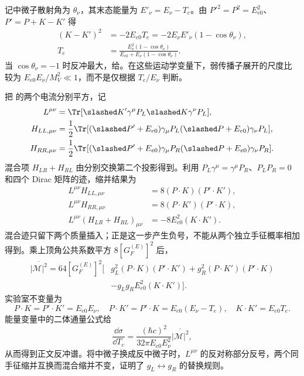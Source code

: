 \begin{derivation}[反冲运动学与手征自旋求和]
记中微子散射角为 $\theta_\nu$，其末态能量为 $E'_\nu=E_\nu-T_e$。由 $P'^2=P^2=E_{e0}^2$、$P'=P+K-K'$ 得
\begin{align*}
 (K-K')^2&=-2E_{e0}T_e
 =-2E_\nu E'_\nu(1-\cos\theta_\nu),\\
 T_e&=\frac{E_\nu^2(1-\cos\theta_\nu)}
 {E_{e0}+E_\nu(1-\cos\theta_\nu)}.
\end{align*}
当 $\cos\theta_\nu=-1$ 时反冲最大，给。在这些运动学变量下，弱传播子展开的尺度比较为 $E_{e0}E_\nu/M_V^2\ll1$，而不是仅根据 $T_e/E_\nu$ 判断。

把 的两个电流分别平方，记
\begin{align*}
 L^{\mu\nu}&=\Tr[\slashed K'\gamma^\mu P_L\slashed K\gamma^\nu P_L],\\
 H_{LL,\mu\nu}&=\frac12\Tr[(\slashed P'+E_{e0})\gamma_\mu P_L
 (\slashed P+E_{e0})\gamma_\nu P_L],\\
 H_{RR,\mu\nu}&=\frac12\Tr[(\slashed P'+E_{e0})\gamma_\mu P_R
 (\slashed P+E_{e0})\gamma_\nu P_R].
\end{align*}
混合项 $H_{LR}+H_{RL}$ 由分别交换第二个投影得到。利用 $P_L\gamma^\mu=\gamma^\mu P_R$、$P_LP_R=0$ 和四个 Dirac 矩阵的迹，缩并结果为
\begin{align*}
 L^{\mu\nu}H_{LL,\mu\nu}&=8(P\cdot K)(P'\cdot K'),\\
 L^{\mu\nu}H_{RR,\mu\nu}&=8(P\cdot K')(P'\cdot K),\\
 L^{\mu\nu}(H_{LR}+H_{RL})_{\mu\nu}&=-8E_{e0}^2(K\cdot K').
\end{align*}
混合迹只留下两个质量插入；正是这一步产生负号，不能从两个独立手征概率相加得到。乘上顶角公共系数平方 $8[G_F^{(E)}]^2$ 后，
\begin{align*}
 \overline{|\mathcal M|^2}=64[G_F^{(E)}]^2\bigl[
 &g_L^2(P\cdot K)(P'\cdot K')+g_R^2(P\cdot K')(P'\cdot K)\\
 &-g_Lg_RE_{e0}^2(K\cdot K')\bigr].
\end{align*}
实验室不变量为
\begin{equation*}
 P\cdot K=P'\cdot K'=E_{e0}E_\nu,\quad
 P\cdot K'=P'\cdot K=E_{e0}(E_\nu-T_e),\quad
 K\cdot K'=E_{e0}T_e.
\end{equation*}
能量变量中的二体通量公式给
\begin{equation*}
 \frac{\dd\sigma}{\dd T_e}
 =\frac{(\hbar c)^2}{32\pi E_{e0}E_\nu^2}\overline{|\mathcal M|^2},
\end{equation*}
从而得到正文反冲谱。将中微子换成反中微子时，$L^{\mu\nu}$ 的反对称部分反号，两个同手征缩并互换而混合缩并不变，证明了 $g_L\leftrightarrow g_R$ 的替换规则。
\end{derivation}

